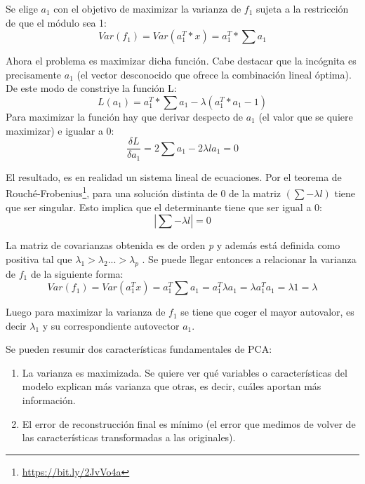 Se elige $a_{1}$ con el objetivo de maximizar la varianza de $f_1$ sujeta a la restricción de que el módulo sea 1:
\begin{equation}
	Var(f_1) = Var(a_1^T * x) = a_1^T * \sum a_1
\end{equation}

Ahora el problema es maximizar dicha función. Cabe destacar que la incógnita es precisamente $a_1$ (el vector desconocido que ofrece la combinación lineal óptima). De este modo de constriye la función L:\cite{PCA}
\begin{equation}
	L(a_1) = a_1^T * \sum a_1 - \lambda(a_1^T * a_1 - 1)
\end{equation}
Para maximizar la función hay que derivar despecto de $a_1$ (el valor que se quiere maximizar) e igualar a 0:
\begin{equation}
\dfrac{\delta L}{\delta a_1} = 2 \sum a_1 - 2\lambda l a_1 = 0
\end{equation}

El resultado, es en realidad un sistema lineal de ecuaciones. Por el teorema de Rouché-Frobenius\footnote{\url{https://bit.ly/2JvVo4a}}, para una solución distinta de 0 de la matriz $(\sum - \lambda l)$ tiene que ser singular. Esto implica que el determinante tiene que ser igual a 0:\cite{PCA}
\begin{equation}
	|\sum - \lambda l| = 0 
\end{equation}

La matriz de covarianzas obtenida es de orden \textit{p} y además está definida como positiva tal que $\lambda_1 > \lambda_2 ...> \lambda_p$ . Se puede llegar entonces a relacionar la varianza de $f_1$ de la siguiente forma:
\begin{equation}
	Var(f_1) = Var(a_1^Tx) = a_1^T \sum a_1 = a_1^T \lambda a_1 = \lambda a_1^T a_1 = \lambda 1 = \lambda
\end{equation}

Luego para maximizar la varianza de $f_1$ se tiene que coger el mayor autovalor, es decir $\lambda_1$ y su correspondiente autovector $a_1$. \cite{PCA} \par
\vspace{0.5cm}
Se pueden resumir dos características fundamentales de PCA:
\begin{enumerate}
\item La varianza es maximizada. Se quiere ver qué variables o características del modelo explican más varianza que otras, es decir, cuáles aportan más información.
\item El error de reconstrucción final es mínimo (el error que medimos de volver de las características transformadas a las originales).
\end{enumerate}

